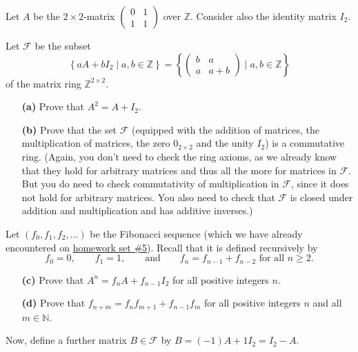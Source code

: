\documentclass[paper=a4, fontsize=12pt]{scrartcl}%
\theoremstyle{plainsl}
\theoremstyle{definition}
\theoremstyle{remark}
\begin{document}
Let $A$ be the $2 \times2$-matrix $%
\begin{pmatrix}
0 & 1\\
1 & 1
\end{pmatrix}
$ over $\mathbb{Z}$. Consider also the identity matrix $I_{2}$.

Let $\mathcal{F}$ be the subset
\[
\left\{  aA+bI_{2}\mid a,b\in\mathbb{Z}\right\}  =\left\{
\begin{pmatrix}
b & a\\
a & a+b
\end{pmatrix}
\mid a,b\in\mathbb{Z}\right\}
\]
of the matrix ring $\mathbb{Z}^{2\times2}$.

\begin{enumerate}
\item[\textbf{(a)}] Prove that $A^{2} = A + I_{2}$.

\item[\textbf{(b)}] Prove that the set $\mathcal{F}$ (equipped with the
addition of matrices, the multiplication of matrices, the zero $0_{2 \times2}$
and the unity $I_{2}$) is a commutative ring. \newline(Again, you don't need
to check the ring axioms, as we already know that they hold for arbitrary
matrices and thus all the more for matrices in $\mathcal{F}$. But you do need
to check commutativity of multiplication in $\mathcal{F}$, since it does not
hold for arbitrary matrices. You also need to check that $\mathcal{F}$ is
closed under addition and multiplication and has additive inverses.)
\end{enumerate}

Let $\left(  f_{0},f_{1},f_{2},\ldots\right)  $ be the Fibonacci sequence
(which we have already encountered on
\href{http://www.cip.ifi.lmu.de/~grinberg/t/19s/hw5s.pdf}{homework set
\#5}). Recall that it is defined recursively by
\[
f_{0}=0,\qquad f_{1}=1,\qquad\text{and}\qquad f_{n}=f_{n-1}+f_{n-2}\text{ for
all }n\geq2.
\]


\begin{enumerate}
\item[\textbf{(c)}] Prove that $A^{n} = f_{n} A + f_{n-1} I_{2}$ for all
positive integers $n$.

\item[\textbf{(d)}] Prove that $f_{n+m}=f_{n}f_{m+1}+f_{n-1}f_{m}$ for all
positive integers $n$ and all $m\in\mathbb{N}$.
\end{enumerate}

Now, define a further matrix $B \in\mathcal{F}$ by $B = \left(  -1 \right)  A
+ 1I_{2} = I_{2} - A$.
\end{document}
